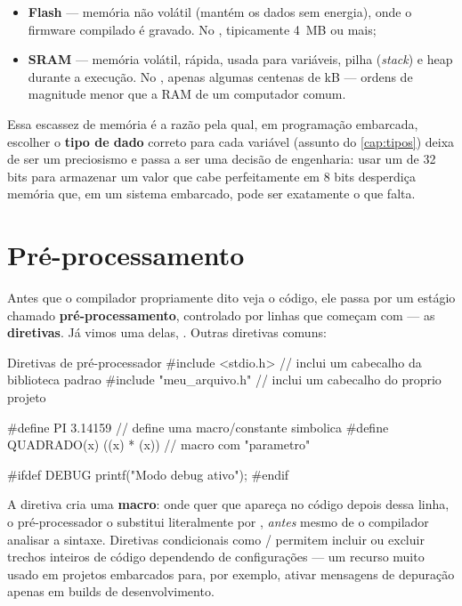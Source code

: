 \begin{itemize}
    \item \textbf{Flash} — memória não volátil (mantém os dados sem energia), onde o firmware compilado é gravado. No \ESP{}, tipicamente 4~MB ou mais;
    \item \textbf{SRAM} — memória volátil, rápida, usada para variáveis, pilha (\emph{stack}) e heap durante a execução. No \ESP{}, apenas algumas centenas de kB — ordens de magnitude menor que a RAM de um computador comum.
\end{itemize}

Essa escassez de memória é a razão pela qual, em programação embarcada, escolher o \textbf{tipo de dado} correto para cada variável (assunto do \cref{cap:tipos}) deixa de ser um preciosismo e passa a ser uma decisão de engenharia: usar um  de 32 bits para armazenar um valor que cabe perfeitamente em 8 bits desperdiça memória que, em um sistema embarcado, pode ser exatamente o que falta.

\section{Pré-processamento}
\label{sec:preprocessamento}

Antes que o compilador propriamente dito veja o código, ele passa por um estágio chamado \textbf{pré-processamento}, controlado por linhas que começam com \code{\#} — as \textbf{diretivas}. Já vimos uma delas, . Outras diretivas comuns:

\begin{codigoc}{Diretivas de pré-processador}
#include <stdio.h>               // inclui um cabecalho da biblioteca padrao
#include "meu_arquivo.h"         // inclui um cabecalho do proprio projeto

#define PI 3.14159               // define uma macro/constante simbolica
#define QUADRADO(x) ((x) * (x))  // macro com "parametro"

#ifdef DEBUG
    printf("Modo debug ativo\n");
#endif
\end{codigoc}

A diretiva  cria uma \textbf{macro}: onde quer que  apareça no código depois dessa linha, o pré-processador o substitui literalmente por , \emph{antes} mesmo de o compilador analisar a sintaxe. Diretivas condicionais como / permitem incluir ou excluir trechos inteiros de código dependendo de configurações — um recurso muito usado em projetos embarcados para, por exemplo, ativar mensagens de depuração apenas em builds de desenvolvimento.

